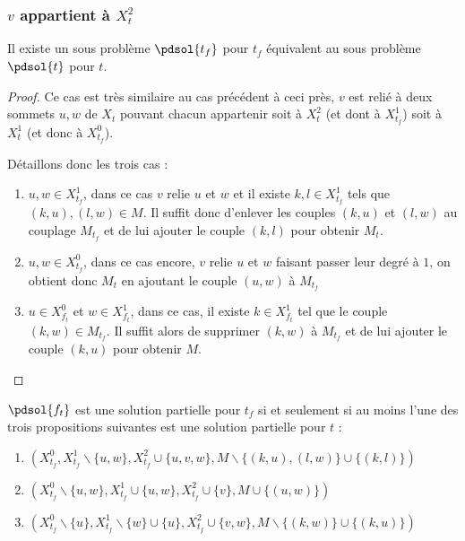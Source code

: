 \subsubsection{$v$ appartient à $X_t^2$}

\begin{nlemma}
    Il existe un sous problème $\pdsol{t_f}$ pour $t_f$ équivalent au sous problème $\pdsol{t}$ pour
    $t$.
\end{nlemma}

\begin{proof}
    Ce cas est très similaire au cas précédent à ceci près, $v$ est relié à deux sommets $u, w$ de
    $X_t$ pouvant chacun appartenir soit à $X_t^2$ (et dont à $X_{t_f}^1$) soit à $X_t^1$ (et donc à
    $X_{t_f}^0$).

    Détaillons donc les trois cas : \begin{enumerate}
        \item $u, w \in X_{t_f}^1$, dans ce cas $v$ relie $u$ et $w$ et il existe $k, l \in
            X_{t_f}^1$ tels que $(k, u), (l,w) \in M$. Il suffit donc d'enlever les
            couples $(k, u)$ et $(l,w)$ au couplage $M_{t_f}$ et de lui ajouter le couple $(k, l)$
            pour obtenir $M_t$.
        \item $u, w \in X_{t_f}^0$, dans ce cas encore, $v$ relie $u$ et $w$ faisant passer leur
            degré à $1$, on obtient donc $M_t$ en ajoutant le couple $(u,w)$ à $M_{t_f}$
        \item $u \in X_{f_t}^0$ et $w \in X_{f_t}^1$, dans ce cas, il existe $k \in X_{f_t}^1$ tel
            que le couple $(k,w) \in M_{t_f}$. Il suffit alors de supprimer $(k,w)$ à $M_{t_f}$ et
            de lui ajouter le couple $(k, u)$ pour obtenir $M$.
    \end{enumerate}
\end{proof}

\begin{ncorol}
    $\pdsol{f_t}$ est une solution partielle pour $t_f$ si et seulement si au moins l'une des trois
    propositions suivantes est une solution partielle pour $t$ :
    \begin{enumerate}
        \item $(X_{t_f}^0, X_{t_f}^1 \backslash \{u, w\}, X_{t_f}^2 \cup \{u, v, w\}, M \backslash
            \{(k, u), (l, w)\} \cup \{(k, l)\})$
        \item $(X_{t_f}^0 \backslash \{u, w\}, X_{t_f}^1 \cup \{u, w\}, X_{t_f}^2 \cup \{v\}, M \cup
            \{(u, w)\})$
        \item $(X_{t_f}^0 \backslash \{u\}, X_{t_f}^1 \backslash \{w\} \cup \{u\}, X_{t_f}^2 \cup
            \{v, w\}, M \backslash \{(k, w)\} \cup \{(k, u)\})$
    \end{enumerate}
\end{ncorol}
        
